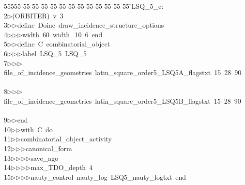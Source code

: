 %
%
\begin{tabbing}
55555 \= 55 \= 55 \= 55 \= 55 \= 55 \= 55 \= 55 \= 55 \= 55 \= 55 \= 55 \= 55 \= \>LSQ\_5\_c:\\[0pt]
2\>$\triangleright$\>(ORBITER)\ v\ 3\ \\[0pt]
3\>$\triangleright$\>$\triangleright$\>define\ Doinc\ draw\_incidence\_structure\_options\ \\[0pt]
4\>$\triangleright$\>$\triangleright$\>$\triangleright$\>width\ 60\ width\_10\ 6\ end\ \\[0pt]
5\>$\triangleright$\>$\triangleright$\>define\ C\ combinatorial\_object\ \\[0pt]
6\>$\triangleright$\>$\triangleright$\>$\triangleright$\>label\ LSQ\_5\ LSQ\_5\ \\[0pt]
7\>$\triangleright$\>$\triangleright$\>$\triangleright$\>file\_of\_incidence\_geometries\ latin\_square\_order5\_LSQ5A\_flagstxt\ 15\ 28\ 90\ \\[0pt]
\>\\[0pt]
8\>$\triangleright$\>$\triangleright$\>$\triangleright$\>file\_of\_incidence\_geometries\ latin\_square\_order5\_LSQ5B\_flagstxt\ 15\ 28\ 90\ \\[0pt]
\>\\[0pt]
9\>$\triangleright$\>$\triangleright$\>end\ \\[0pt]
10\>$\triangleright$\>$\triangleright$\>with\ C\ do\ \\[0pt]
11\>$\triangleright$\>$\triangleright$\>combinatorial\_object\_activity\ \\[0pt]
12\>$\triangleright$\>$\triangleright$\>$\triangleright$\>canonical\_form\ \\[0pt]
13\>$\triangleright$\>$\triangleright$\>$\triangleright$\>$\triangleright$\>save\_ago\ \\[0pt]
14\>$\triangleright$\>$\triangleright$\>$\triangleright$\>$\triangleright$\>max\_TDO\_depth\ 4\ \\[0pt]
15\>$\triangleright$\>$\triangleright$\>$\triangleright$\>$\triangleright$\>nauty\_control\ nauty\_log\ LSQ5\_nauty\_logtxt\ end\ \\[0pt]

\end{tabbing}

